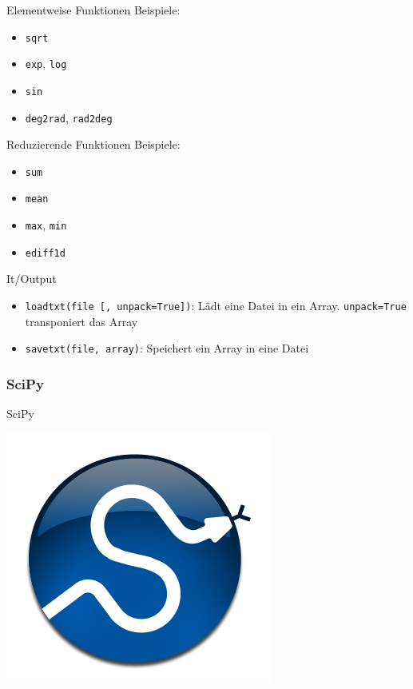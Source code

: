 \begin{frame}{Elementweise Funktionen}
  Beispiele:
  \begin{itemize}
    \item \texttt{sqrt}
    \item \texttt{exp}, \texttt{log}
    \item \texttt{sin}
    \item \texttt{deg2rad}, \texttt{rad2deg}
  \end{itemize}
\end{frame}

\begin{frame}{Reduzierende Funktionen}
  Beispiele:
  \begin{itemize}
    \item \texttt{sum}
    \item \texttt{mean}
    \item \texttt{max}, \texttt{min}
    \item \texttt{ediff1d}
  \end{itemize}
\end{frame}

\begin{frame}{It/Output}
  \begin{itemize}
    \item \texttt{loadtxt(file [, unpack=True])}: Lädt eine Datei in ein Array.
      \texttt{unpack=True} transponiert das Array
    \item \texttt{savetxt(file, array)}: Speichert ein Array in eine Datei
  \end{itemize}
\end{frame}

\subsubsection{SciPy}
\begin{frame}{SciPy}
  \begin{center}
    \includegraphics{../Notes/img/scipy.pdf}
  \end{center}
\end{frame}


